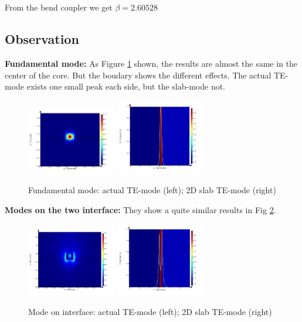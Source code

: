 \documentclass[fontsize=11pt]{scrartcl}
\begin{document}
\subsection{}
From the bend coupler we get $\beta=2.60528$
\subsection{Observation}
\textbf{Fundamental mode:} As Figure \ref{fig1.1} shown, 
the results are almost the same in the center of the core. 
But the boudary shows the different effects. 
The actual TE-mode exists one small peak each side, but the slab-mode not.
\begin{figure}[H]
    \centering
     \includegraphics[width=0.35\textwidth]{img/fig1.1a.jpg} %
     \includegraphics[width=0.35\textwidth]{img/fig1.1b.jpg}
     \caption{Fundamental mode: actual TE-mode (left); 2D slab TE-mode (right)}
     \label{fig1.1}
\end{figure}
\textbf{Modes on the two interface:} They show a quite similar results in Fig \ref{fig1.2}.
\begin{figure}[H]
    \centering
     \includegraphics[width=0.35\textwidth]{img/fig1.2a.jpg} %
     \includegraphics[width=0.35\textwidth]{img/fig1.2b.jpg}
     \caption{Mode on interface: actual TE-mode (left); 2D slab TE-mode (right)}
     \label{fig1.2}
\end{figure} 
\end{document}
